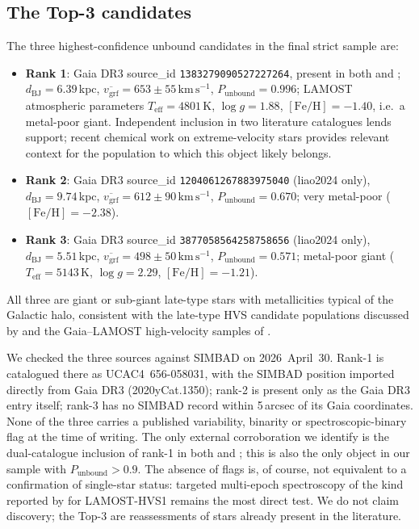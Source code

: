 \documentclass{caosp310}
\newcommand{\vgrf}{v_{\mathrm{grf}}}
\newcommand{\Punb}{P_{\mathrm{unbound}}}
\newcommand{\kmps}{\ensuremath{\,\mathrm{km}\,\mathrm{s}^{-1}}}
\begin{document}
\subsection{The Top-3 candidates}
\label{sec:top3}

The three highest-confidence unbound candidates in the final strict
sample are:
\begin{itemize}
  \item \textbf{Rank 1}: Gaia DR3 source\_id \texttt{1383279090527227264},
        present in both \citet{Li2021HVS591} and \citet{Liao2024HVS519};
        $d_{\mathrm{BJ}}=6.39$\,kpc, $\overline{\vgrf}=653\pm 55\kmps$,
        $\Punb=0.996$; LAMOST atmospheric parameters
        $T_\mathrm{eff}=4801$\,K, $\log g=1.88$, $[\mathrm{Fe/H}]=-1.40$,
        i.e.\ a metal-poor giant. Independent inclusion in two literature
        catalogues lends support; recent chemical work on extreme-velocity
        stars \citep{Nelson2024ExtremeVelChem} provides relevant context
        for the population to which this object likely belongs.
  \item \textbf{Rank 2}: Gaia DR3 source\_id \texttt{1204061267883975040}
        (liao2024 only), $d_{\mathrm{BJ}}=9.74$\,kpc,
        $\overline{\vgrf}=612\pm 90\kmps$, $\Punb=0.670$; very metal-poor
        ($[\mathrm{Fe/H}]=-2.38$).
  \item \textbf{Rank 3}: Gaia DR3 source\_id \texttt{3877058564258758656}
        (liao2024 only), $d_{\mathrm{BJ}}=5.51$\,kpc,
        $\overline{\vgrf}=498\pm 50\kmps$, $\Punb=0.571$; metal-poor
        giant ($T_\mathrm{eff}=5143$\,K, $\log g=2.29$,
        $[\mathrm{Fe/H}]=-1.21$).
\end{itemize}
All three are giant or sub-giant late-type stars with metallicities
typical of the Galactic halo, consistent with the late-type HVS
candidate populations discussed by \citet{Li2020LateTypeHVS} and the
Gaia--LAMOST high-velocity samples of \citet{Du2018LocalHalo,Du2018Origin}.

We checked the three sources against SIMBAD on 2026~April~30. Rank-1 is
catalogued there as UCAC4~656-058031, with the SIMBAD position imported
directly from Gaia DR3 (2020yCat.1350); rank-2 is present only as the
Gaia DR3 entry itself; rank-3 has no SIMBAD record within 5\,arcsec of
its Gaia coordinates. None of the three carries a published variability,
binarity or spectroscopic-binary flag at the time of writing. The only
external corroboration we identify is the dual-catalogue inclusion of
rank-1 in both \citet{Li2021HVS591} and \citet{Liao2024HVS519}; this is
also the only object in our sample with $\Punb>0.9$. The absence of
flags is, of course, not equivalent to a confirmation of single-star
status: targeted multi-epoch spectroscopy of the kind reported by
\citet{Hattori2019LAMOSTHVS1} for LAMOST-HVS1 remains the most direct
test. We do not claim discovery; the Top-3 are reassessments of stars
already present in the literature.
\end{document}
